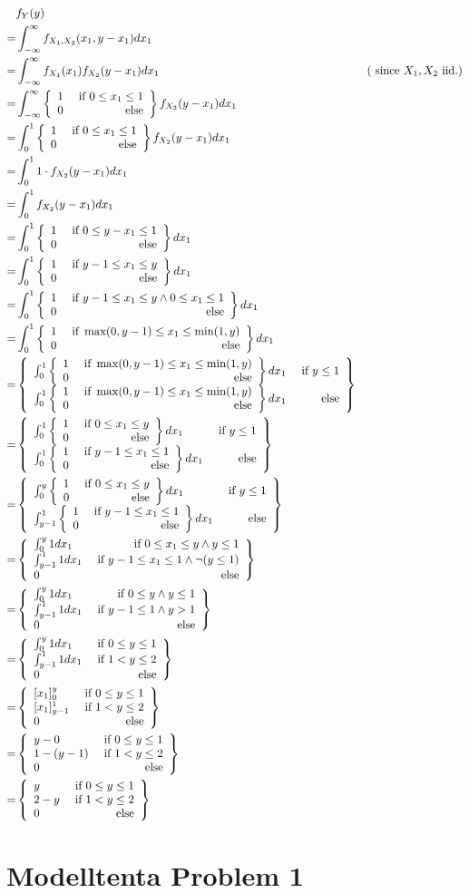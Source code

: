 \documentclass{article}
\begin{document}
\begin{align*}
	 & f_Y(y) \\
	=& \int_{-\infty}^\infty f_{X_1,X_2}(x_1,y-x_1)dx_1 \\
	=& \int_{-\infty}^\infty f_{X_1}(x_1)f_{X_2}(y-x_1)dx_1 & (\text{ since } X_1,X_2\text{ iid.}) \\
	=& \int_{-\infty}^\infty \casesii{1}{0\leq x_1 \leq 1}{0}f_{X_2}(y-x_1)dx_1 \\
	=& \int_0^1 \casesii{1}{0\leq x_1 \leq 1}{0}f_{X_2}(y-x_1)dx_1 \\
	=& \int_0^1 1\cdot f_{X_2}(y-x_1)dx_1 \\
	=& \int_0^1 f_{X_2}(y-x_1)dx_1 \\
	=& \int_0^1 \casesii{1}{0\leq y-x_1\leq 1}{0}dx_1 \\
	=& \int_0^1 \casesii{1}{y-1\leq x_1\leq y}{0}dx_1 \\
	=& \int_0^1 \casesii{1}{y-1\leq x_1\leq y\wedge 0\leq x_1 \leq 1}{0}dx_1 \\
	=& \int_0^1 \casesii{1}{\max(0,y-1)\leq x_1\leq \min(1,y)}{0}dx_1 \\
	=& \casesii{\int_0^1 \casesii{1}{\max(0,y-1)\leq x_1\leq \min(1,y)}{0}dx_1}{y \leq 1}{\int_0^1 \casesii{1}{\max(0,y-1)\leq x_1\leq \min(1,y)}{0}dx_1} \\
	=& \casesii{\int_0^1 \casesii{1}{0\leq x_1\leq y}{0}dx_1}{y \leq 1}{\int_0^1 \casesii{1}{y-1\leq x_1\leq 1}{0}dx_1} \\
	=& \casesii{\int_0^y \casesii{1}{0\leq x_1\leq y}{0}dx_1}{y \leq 1}{\int_{y-1}^1 \casesii{1}{y-1\leq x_1\leq 1}{0}dx_1} \\
	=& \casesiii{\int_0^y 1dx_1}{0\leq x_1 \leq y \wedge y\leq 1}{\int_{y-1}^1 1dx_1}{y-1\leq x_1 \leq 1 \wedge \neg(y\leq 1)}{0} \\
	=& \casesiii{\int_0^y 1dx_1}{0\leq y \wedge y\leq 1}{\int_{y-1}^1 1dx_1}{y-1\leq 1 \wedge y>1}{0} \\
	=& \casesiii{\int_0^y 1dx_1}{0\leq y\leq 1}{\int_{y-1}^1 1dx_1}{1<y\leq 2}{0} \\
	=& \casesiii{\hakparen{x_1}_0^y}{0\leq y\leq 1}{\hakparen{x_1}_{y-1}^1}{1<y\leq 2}{0} \\
	=& \casesiii{y-0}{0\leq y\leq 1}{1-(y-1)}{1<y\leq 2}{0} \\
	=& \casesiii{y}{0\leq y\leq 1}{2-y}{1<y\leq 2}{0} \\
\end{align*}

\section{Modelltenta Problem 1}
\end{document}
